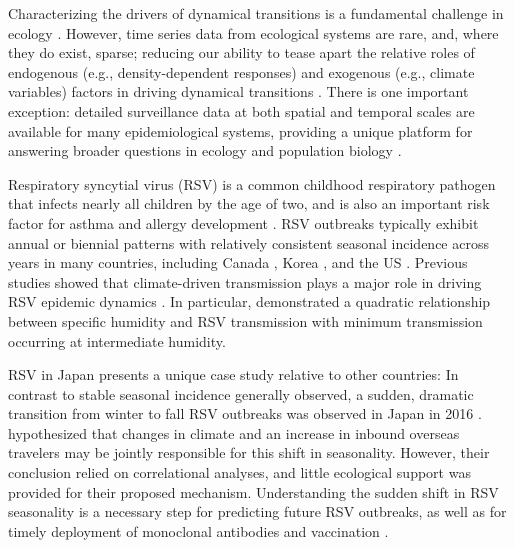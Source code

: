 \documentclass[12pt]{article}
\begin{document}
Characterizing the drivers of dynamical transitions is a fundamental challenge in ecology \citep{earn2000simple,hastings2004transients,hastings2018transient}.
However, time series data from ecological systems are rare, and, where they do exist, sparse; reducing our ability to tease apart the relative roles of endogenous (e.g., density-dependent responses) and exogenous (e.g., climate variables) factors in driving dynamical transitions \citep{hunter1998cycles,lundberg2000population,hernandez2012fluctuations}.
There is one important exception: detailed surveillance data at both spatial and temporal scales are available for many epidemiological systems, providing a unique platform for answering broader questions in ecology and population biology \citep{levin1997mathematical,anderson1991infectious,grenfell2001travelling,he2010plug}.

Respiratory syncytial virus (RSV) is a common childhood respiratory pathogen that infects nearly all children by the age of two, and is also an important risk factor for asthma and allergy development \citep{sigurs1995asthma,sigurs2010asthma,edwards2012microbiology}.
RSV outbreaks typically exhibit annual or biennial patterns with relatively consistent seasonal incidence across years in many countries, including Canada \citep{paramo2023respiratory}, Korea \citep{kim2020investigation}, and the US \citep{pitzer2015environmental,baker2019epidemic}.
Previous studies showed that climate-driven transmission plays a major role in driving RSV epidemic dynamics \citep{pitzer2015environmental,baker2019epidemic}.
In particular, \cite{baker2019epidemic} demonstrated a quadratic relationship between specific humidity and RSV transmission with minimum transmission occurring at intermediate humidity.

RSV in Japan presents a unique case study relative to other countries: In contrast to stable seasonal incidence generally observed, a sudden, dramatic transition from winter to fall RSV outbreaks was observed in Japan in 2016 \citep{miyama2021seasonal,wagatsuma2021shifts}.
\cite{wagatsuma2021shifts} hypothesized that changes in climate and an increase in inbound overseas travelers may be jointly responsible for this shift in seasonality.
However, their conclusion relied on correlational analyses, and little ecological support was provided for their proposed mechanism.
Understanding the sudden shift in RSV seasonality is a necessary step for predicting future RSV outbreaks, as well as for timely deployment of monoclonal antibodies and vaccination \citep{mazur2023respiratory}.
\end{document}
